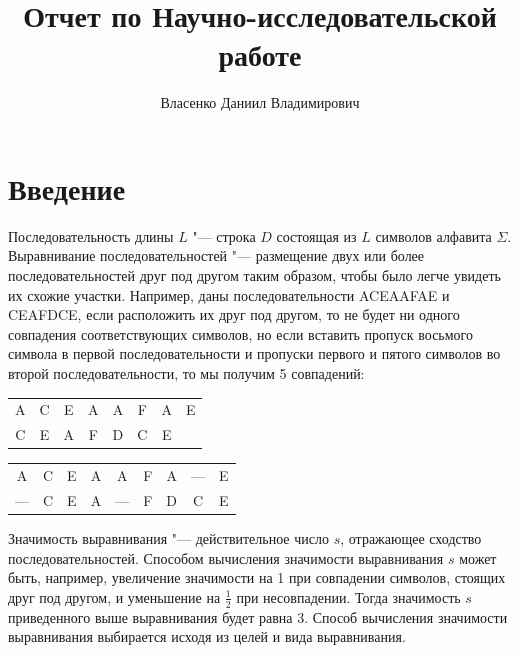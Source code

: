\documentclass[specialist,
substylefile = spbu_report.rtx,
subf,href,colorlinks=true, 12pt]{disser}
\begin{document}
	
	\title{Отчет по Научно-исследовательской работе}	
	\author{Власенко Даниил Владимирович}
	\date{\number\year}	
	\maketitle
	
	
	\section{Введение}
		Последовательность длины $L$ "--- строка $D$ состоящая из $L$ символов алфавита $\Sigma$. Выравнивание последовательностей  "--- размещение двух или более последовательностей друг под другом таким образом, чтобы было легче увидеть их схожие участки. Например, даны последовательности ACEAAFAE и CEAFDCE, если расположить их друг под другом, то не будет ни одного совпадения соответствующих символов, но если вставить пропуск восьмого символа в первой последовательности и пропуски первого и пятого символов во второй последовательности, то мы получим 5 совпадений:
		\begin{center}
			\begin{tabular}{cccccccc}
				A&C&E&A&A&F&A&E\\
				C&E&A&F&D&C&E&\\
			\end{tabular}
		\end{center}
		\begin{center}
			\begin{tabular}{ccccccccc}
				A&C&E&A&A&F&A&—&E\\
				—&C&E&A&—&F&D&C&E\\
			\end{tabular}
		\end{center}
		Значимость выравнивания "--- действительное число $s$, отражающее сходство последовательностей. Способом вычисления значимости выравнивания $s$ может быть, например, увеличение значимости на 1 при совпадении символов, стоящих друг под другом, и уменьшение на $\frac{1}{2}$ при несовпадении. Тогда значимость $s$ приведенного выше выравнивания будет равна 3. Способ вычисления значимости выравнивания выбирается исходя из целей и вида выравнивания.
		
\end{document}
